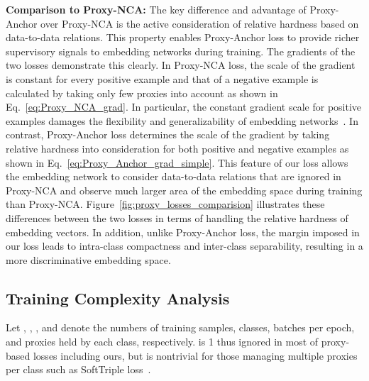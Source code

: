 \documentclass[10pt,twocolumn,letterpaper]{article}
\begin{document}
\vspace{2mm}
\noindent \textbf{Comparison to Proxy-NCA:}
The key difference and advantage of Proxy-Anchor over Proxy-NCA is the active consideration of relative hardness based on data-to-data relations.
This property enables Proxy-Anchor loss to provide richer supervisory signals to embedding networks during training.
The gradients of the two losses demonstrate this clearly.
In Proxy-NCA loss, the scale of the gradient is constant for every positive example and that of a negative example is calculated by taking only few proxies into account as shown in Eq.~\eqref{eq:Proxy_NCA_grad}.
In particular, the constant gradient scale for positive examples damages the flexibility and generalizability of embedding networks~\cite{sampling_matters}. 
In contrast, Proxy-Anchor loss determines the scale of the gradient by taking relative hardness into consideration for both positive and negative examples as shown in Eq.~\eqref{eq:Proxy_Anchor_grad_simple}. 
This feature of our loss allows the embedding network to consider data-to-data relations that are ignored in Proxy-NCA and observe much larger area of the embedding space during training than Proxy-NCA.
Figure~\ref{fig:proxy_losses_comparision} illustrates these differences between the two losses in terms of handling the relative hardness of embedding vectors.
In addition, unlike Proxy-Anchor loss, the margin imposed in our loss leads to intra-class compactness and inter-class separability, resulting in a more discriminative embedding space. 
































\subsection{Training Complexity Analysis}
\label{sec:complexity_analysis}
Let , , , and  denote the numbers of training samples, classes, batches per epoch, and proxies held by each class, respectively.
 is 1 thus ignored in most of proxy-based losses including ours, but is nontrivial for those managing multiple proxies per class such as SoftTriple loss~\cite{Qian_2019_ICCV}.
\end{document}
